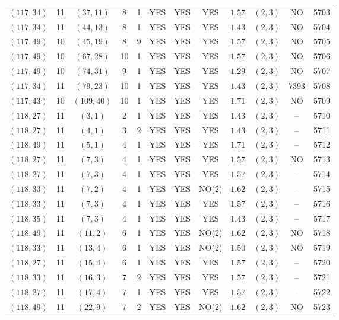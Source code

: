 \begin{longtable}{|c|c|c|c|c|c|c|c|c|c|c|c|}
$(117,34)$ & 11 & $(37,11)$ & 8 & 1 & YES & YES & YES & $1.57$ & $(2,3)$ & NO & 5703\\
$(117,34)$ & 11 & $(44,13)$ & 8 & 1 & YES & YES & YES & $1.43$ & $(2,3)$ & NO & 5704\\
$(117,49)$ & 10 & $(45,19)$ & 8 & 9 & YES & YES & YES & $1.57$ & $(2,3)$ & NO & 5705\\
$(117,49)$ & 10 & $(67,28)$ & 10 & 1 & YES & YES & YES & $1.57$ & $(2,3)$ & NO & 5706\\
$(117,49)$ & 10 & $(74,31)$ & 9 & 1 & YES & YES & YES & $1.29$ & $(2,3)$ & NO & 5707\\
$(117,34)$ & 11 & $(79,23)$ & 10 & 1 & YES & YES & YES & $1.43$ & $(2,3)$ & 7393 & 5708\\
$(117,43)$ & 10 & $(109,40)$ & 10 & 1 & YES & YES & YES & $1.71$ & $(2,3)$ & NO & 5709\\
$(118,27)$ & 11 & $(3,1)$ & 2 & 1 & YES & YES & YES & $1.43$ & $(2,3)$ & -- & 5710\\
$(118,27)$ & 11 & $(4,1)$ & 3 & 2 & YES & YES & YES & $1.43$ & $(2,3)$ & -- & 5711\\
$(118,49)$ & 11 & $(5,1)$ & 4 & 1 & YES & YES & YES & $1.71$ & $(2,3)$ & -- & 5712\\
$(118,27)$ & 11 & $(7,3)$ & 4 & 1 & YES & YES & YES & $1.57$ & $(2,3)$ & NO & 5713\\
$(118,27)$ & 11 & $(7,3)$ & 4 & 1 & YES & YES & YES & $1.57$ & $(2,3)$ & -- & 5714\\
$(118,33)$ & 11 & $(7,2)$ & 4 & 1 & YES & YES & NO(2) & $1.62$ & $(2,3)$ & -- & 5715\\
$(118,33)$ & 11 & $(7,3)$ & 4 & 1 & YES & YES & YES & $1.57$ & $(2,3)$ & -- & 5716\\
$(118,35)$ & 11 & $(7,3)$ & 4 & 1 & YES & YES & YES & $1.43$ & $(2,3)$ & -- & 5717\\
$(118,49)$ & 11 & $(11,2)$ & 6 & 1 & YES & YES & NO(2) & $1.62$ & $(2,3)$ & NO & 5718\\
$(118,33)$ & 11 & $(13,4)$ & 6 & 1 & YES & YES & NO(2) & $1.50$ & $(2,3)$ & NO & 5719\\
$(118,27)$ & 11 & $(15,4)$ & 6 & 1 & YES & YES & YES & $1.57$ & $(2,3)$ & -- & 5720\\
$(118,33)$ & 11 & $(16,3)$ & 7 & 2 & YES & YES & YES & $1.57$ & $(2,3)$ & -- & 5721\\
$(118,27)$ & 11 & $(17,4)$ & 7 & 1 & YES & YES & YES & $1.57$ & $(2,3)$ & -- & 5722\\
$(118,49)$ & 11 & $(22,9)$ & 7 & 2 & YES & YES & NO(2) & $1.62$ & $(2,3)$ & NO & 5723\\

\end{longtable}
